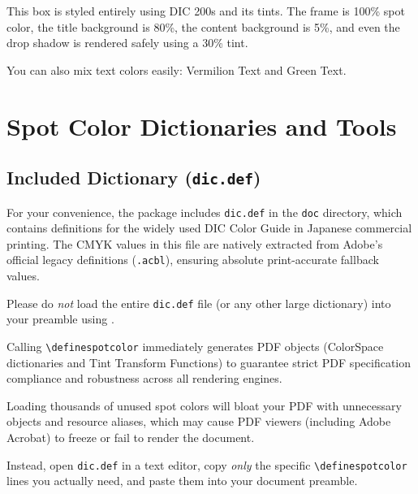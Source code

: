 \documentclass[luatex]{article}\listfiles
\begin{document}
\vspace{1em}
\begin{tcolorbox}[
  enhanced,
  colframe=DIC200s,               %
  colback=DIC200s!5,              %
  coltitle=white,                 %
  colbacktitle=DIC200s!80,        %
  fonttitle=\sffamily\bfseries,
  title={Triadic Harmony with \textsf{tcolorbox}},
  drop fuzzy shadow=DIC200s!30    %
]
This box is styled entirely using DIC 200s and its tints.
The frame is 100\% spot color, the title background is 80\%, the content background is 5\%, and even the drop shadow is rendered safely using a 30\% tint.

\vspace{0.5em}
\noindent You can also mix text colors easily: \textcolor{DIC161s}{Vermilion Text} and \textcolor{DIC256s}{Green Text}.
\end{tcolorbox}


\section{Spot Color Dictionaries and Tools}

\subsection{Included Dictionary (\texttt{dic.def})}
For your convenience, the package includes \texttt{dic.def} in the \texttt{doc} directory, which contains definitions for the widely used DIC Color Guide in Japanese commercial printing.
The CMYK values in this file are natively extracted from Adobe's official legacy definitions (\texttt{.acbl}), ensuring absolute print-accurate fallback values.

\begin{tcolorbox}[
  enhanced,
  colframe=DIC161s!90!black,
  colback=DIC161s!5,
  coltitle=white,
  colbacktitle=DIC161s,
  fonttitle=\sffamily\bfseries\large,
  title={\raisebox{-0.2ex}{\Huge \textbf{!}}\quad IMPORTANT WARNING},
  drop fuzzy shadow=DIC161s!30,
  attach boxed title to top left={xshift=10pt, yshift=-10pt},
  boxed title style={rounded corners, sharp corners=southwest}
]
Please do \emph{not} load the entire \texttt{dic.def} file (or any other large dictionary) into your preamble using \verb||.

Calling \verb|\definespotcolor| immediately generates PDF objects (ColorSpace dictionaries and Tint Transform Functions) to guarantee strict PDF specification compliance and robustness across all rendering engines.

Loading thousands of unused spot colors will bloat your PDF with unnecessary objects and resource aliases, which may cause PDF viewers (including Adobe Acrobat) to freeze or fail to render the document.

Instead, open \texttt{dic.def} in a text editor, copy \emph{only} the specific \verb|\definespotcolor| lines you actually need, and paste them into your document preamble.
\end{tcolorbox}
\end{document}
